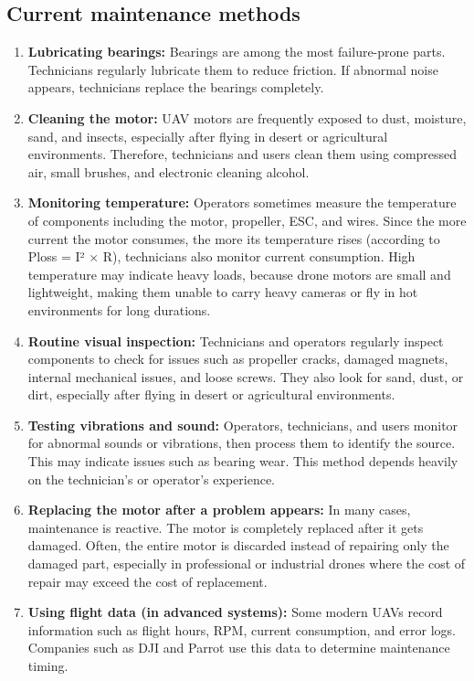 \subsection*{Current maintenance methods}

\begin{enumerate}
    \item \textbf{Lubricating bearings:} Bearings are among the most failure-prone parts. Technicians regularly lubricate them to reduce friction. If abnormal noise appears, technicians replace the bearings completely.
    
    \item \textbf{Cleaning the motor:} UAV motors are frequently exposed to dust, moisture, sand, and insects, especially after flying in desert or agricultural environments. Therefore, technicians and users clean them using compressed air, small brushes, and electronic cleaning alcohol.
    
    \item \textbf{Monitoring temperature:} Operators sometimes measure the temperature of components including the motor, propeller, ESC, and wires. Since the more current the motor consumes, the more its temperature rises (according to Ploss = I² × R), technicians also monitor current consumption. High temperature may indicate heavy loads, because drone motors are small and lightweight, making them unable to carry heavy cameras or fly in hot environments for long durations.
    
    \item \textbf{Routine visual inspection:} Technicians and operators regularly inspect components to check for issues such as propeller cracks, damaged magnets, internal mechanical issues, and loose screws. They also look for sand, dust, or dirt, especially after flying in desert or agricultural environments.
    
    \item \textbf{Testing vibrations and sound:} Operators, technicians, and users monitor for abnormal sounds or vibrations, then process them to identify the source. This may indicate issues such as bearing wear. This method depends heavily on the technician's or operator's experience.
    
    \item \textbf{Replacing the motor after a problem appears:} In many cases, maintenance is reactive. The motor is completely replaced after it gets damaged. Often, the entire motor is discarded instead of repairing only the damaged part, especially in professional or industrial drones where the cost of repair may exceed the cost of replacement.
    
    \item \textbf{Using flight data (in advanced systems):} Some modern UAVs record information such as flight hours, RPM, current consumption, and error logs. Companies such as DJI and Parrot use this data to determine maintenance timing.
\end{enumerate}

